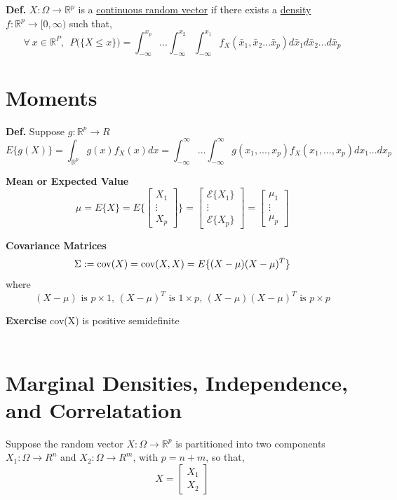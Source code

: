 \documentclass[letterpaper]{article}
\newcommand{\real}{\mathbb R}  %
\newcommand{\E}{\mathcal{E}}
\begin{document}
         \textbf{Def.}   $X: \Omega \rightarrow \real^p$ is a \ul{continuous random vector} if there exists a \ul{density} $f:\real^p \to [0, \infty)$ such that,
 $$\forall~x\in \real^P,~~P\big(\{ X \le x\} \big)= \int_{-\infty}^{x_p} ... \int_{-\infty}^{x_2} \int_{-\infty}^{x_1}f_X(\bar{x}_1,\bar{x}_2...\bar{x}_p) d \bar{x}_1 d \bar{x}_2 ... d \bar{x}_p$$

 \newpage

\section{Moments}

\textbf{Def.} Suppose $g: \real^p \rightarrow R$
        $$E\{g(X)\}=\int_{\real^p}g(x)f_X(x)dx=\int_{-\infty}^{\infty}...\int_{-\infty}^{\infty}g(x_1,...,x_p)f_X(x_1,...,x_p)dx_1...dx_p$$

        \noindent
        \textbf{Mean or Expected Value}$$\mu=E\{X\}=E\{\left[ \begin{array}{ccc}X_1\\\vdots\\X_p\end{array} \right]\}=\left[ \begin{array}{ccc}\E\{X_1\}\\\vdots\\ \E\{X_p\}\end{array} \right]=
        \left[ \begin{array}{ccc}\mu_1\\\vdots\\\mu_p \end{array} \right]$$

        \noindent
        \textbf{Covariance Matrices}$$\Sigma:={\rm cov}(X)={\rm cov}(X,X)=E\{(X-\mu)(X-\mu)^T\}$$
        where
        $$(X-\mu) \mbox{ is }p\times 1 \mbox{, } (X-\mu)^T \mbox{ is }1\times p\mbox{, } (X-\mu)(X-\mu)^T \mbox{ is }p\times p$$

        \noindent
        \textbf{Exercise} cov(X) is positive semidefinite \\ \\

\newpage

   \section{Marginal Densities, Independence, and Correlatation}
        Suppose the random vector $X: \Omega \rightarrow \real^p$ is partitioned into two components $X_1 : \Omega \rightarrow R^n$ and $X_2:\Omega \rightarrow R^m $, with $p=n+m$, so that,
        $$ X = \left[ \begin{array}{cc} X_1 \\
                                               X_2 \end{array} \right]$$
\end{document}
